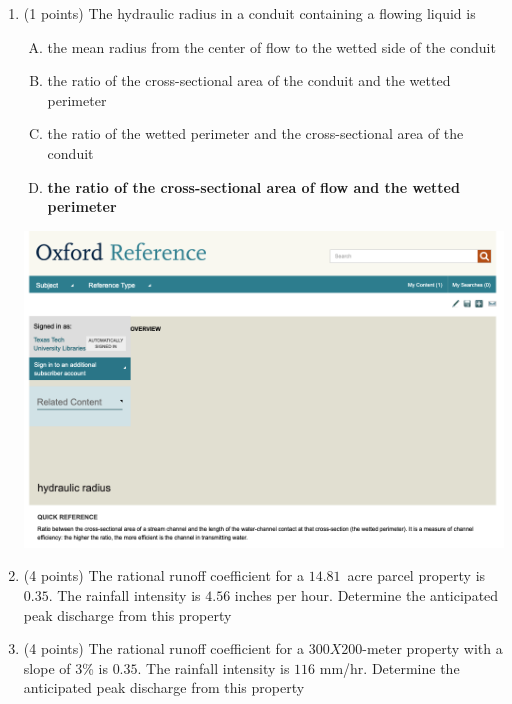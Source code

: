 \documentclass[12pt]{article}
\begin{document}
\begin{enumerate}
\clearpage

\item (1 points) The hydraulic radius in a conduit containing a flowing liquid is
\begin{enumerate} [(A)]
\item	the mean radius from the center of flow to the wetted side of the conduit
\item	the ratio of the cross-sectional area of the conduit and the wetted perimeter
\item	the ratio of the wetted perimeter and the cross-sectional area of the conduit
\item	\textbf{the ratio of the cross-sectional area of flow and the wetted perimeter}
\end{enumerate}

 \includegraphics[width=6.5in]{ScreenShot.png}

\clearpage
\item (4 points) The rational runoff coefficient for a $14.81$~acre parcel property is $0.35$.  
The rainfall intensity is $4.56$ inches per hour.  
Determine the anticipated peak discharge from this property

\clearpage
\item (4 points) The rational runoff coefficient for a $300X200$-meter property with a slope of $3$\% is $0.35$.  The rainfall intensity is $116$ mm/hr.  Determine the anticipated peak discharge from this property


\end{enumerate}
\end{document}
